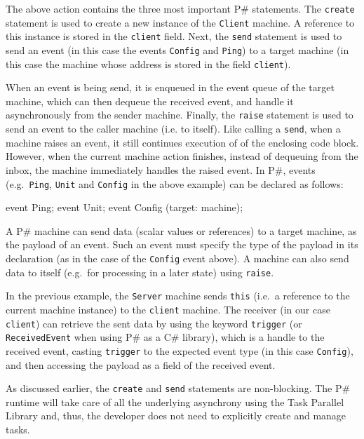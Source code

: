 \documentclass{llncs}
\newcommand{\ps}{P\#\xspace}
\newcommand{\cs}{C\#\xspace}
\begin{document}
\noindent
The above action contains the three most important \ps statements. The \texttt{create} statement is used to create a new instance of the \texttt{Client} machine. A reference to this instance is stored in the \texttt{client} field. Next, the \texttt{send} statement is used to send an event (in this case the events \texttt{Config} and \texttt{Ping}) to a target machine (in this case the machine whose address is stored in the field \texttt{client}).

When an event is being send, it is enqueued in the event queue of the target
machine, which can then dequeue the received event, and handle it asynchronously
from the sender machine. Finally, the \texttt{raise} statement is used to send
an event to the caller machine (i.e. to itself). Like calling a \texttt{send}, 
when a machine raises an event, it still continues execution of of the enclosing
code block. However, when the current machine action finishes, instead of
dequeuing from the inbox, the machine immediately handles the raised event. 
In \ps, events (e.g.\ \texttt{Ping}, \texttt{Unit} and \texttt{Config} in the above example) can be declared as follows:

\begin{psharpNoLines}
event Ping;
event Unit;
event Config (target: machine);
\end{psharpNoLines}

\noindent
A \ps machine can send data (scalar values or references) to a target machine, as the payload of an event. Such an event must specify the type of the payload in its declaration (as in the case of the \texttt{Config} event above). A machine can also send data to itself (e.g.\ for processing in a later state) using \texttt{raise}.

In the previous example, the \texttt{Server} machine sends \texttt{this} (i.e.\ a reference to the current machine instance) to the \texttt{client} machine. The receiver (in our case \texttt{client}) can retrieve the sent data by using the keyword \texttt{trigger} (or \texttt{ReceivedEvent} when using \ps as a \cs library), which is a handle to the received event, casting \texttt{trigger} to the expected event type (in this case \texttt{Config}), and then accessing the payload as a field of the received event.

As discussed earlier, the \texttt{create} and \texttt{send} statements are non-blocking. The \ps runtime will take care of all the underlying asynchrony using the Task Parallel Library and, thus, the developer does not need to explicitly create and manage tasks.
\end{document}
